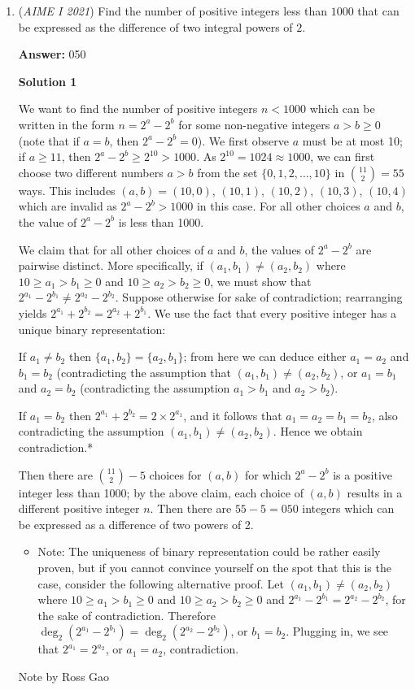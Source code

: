 \begin{enumerate}
	\item (\textit{AIME I 2021}) Find the number of positive integers less than $1000$ that can be expressed as the difference of two integral powers of $2.$

 \textbf{Answer: }050



\textbf{Solution 1}

We want to find the number of positive integers $n<1000$ which can be written in the form $n = 2^a - 2^b$ for some non-negative integers $a > b \ge 0$ (note that if $a=b$, then $2^a-2^b = 0$). We first observe $a$ must be at most 10; if $a \ge 11$, then $2^a - 2^b \ge 2^{10} > 1000$. As $2^{10} = 1024 \approx 1000$, we can first choose two different numbers $a > b$ from the set $\{0,1,2,\ldots,10\}$ in $\binom{11}{2}=55$ ways. This includes $(a,b) = (10,0)$, $(10,1)$, $(10,2)$, $(10,3)$, $(10,4)$ which are invalid as $2^a - 2^b > 1000$ in this case. For all other choices $a$ and $b$, the value of $2^a - 2^b$ is less than 1000.

 We claim that for all other choices of $a$ and $b$, the values of $2^a - 2^b$ are pairwise distinct. More specifically, if $(a_1,b_1) \neq (a_2,b_2)$ where $10 \ge a_1 > b_1 \ge 0$ and $10 \ge a_2 > b_2 \ge 0$, we must show that $2^{a_1}-2^{b_1} \neq 2^{a_2} - 2^{b_2}$. Suppose otherwise for sake of contradiction; rearranging yields $2^{a_1}+2^{b_2} = 2^{a_2}+2^{b_1}$. We use the fact that every positive integer has a unique binary representation:

 If $a_1 \neq b_2$ then $\{a_1,b_2\} = \{a_2,b_1\}$; from here we can deduce either $a_1=a_2$ and $b_1=b_2$ (contradicting the assumption that $(a_1,b_1) \neq (a_2,b_2)$, or $a_1=b_1$ and $a_2=b_2$ (contradicting the assumption $a_1>b_1$ and $a_2>b_2$).

 If $a_1 = b_2$ then $2^{a_1}+2^{b_2} = 2 \times 2^{a_1}$, and it follows that $a_1=a_2=b_1=b_2$, also contradicting the assumption $(a_1,b_1) \neq (a_2,b_2)$. Hence we obtain contradiction.*

 Then there are $\binom{11}{2}-5$ choices for $(a,b)$ for which $2^a - 2^b$ is a positive integer less than 1000; by the above claim, each choice of $(a,b)$ results in a different positive integer $n$. Then there are $55-5 = \boxed{050}$ integers which can be expressed as a difference of two powers of 2.

 


 
            \begin{itemize}
        \item Note: The uniqueness of binary representation could be rather easily proven, but if you cannot convince yourself on the spot that this is the case, consider the following alternative proof. Let $(a_1,b_1) \neq (a_2,b_2)$ where $10 \ge a_1 > b_1 \ge 0$ and $10 \ge a_2 > b_2 \ge 0$ and $2^{a_1}-2^{b_1} = 2^{a_2} - 2^{b_2}$, for the sake of contradiction. Therefore $\deg_{2}(2^{a_1}-2^{b_1})=\deg_{2}(2^{a_2}-2^{b_2})$, or $b_1=b_2$. Plugging in, we see that $2^{a_1}=2^{a_2}$, or $a_1=a_2$, contradiction.
            \end{itemize}
            Note by Ross Gao


\end{enumerate}
